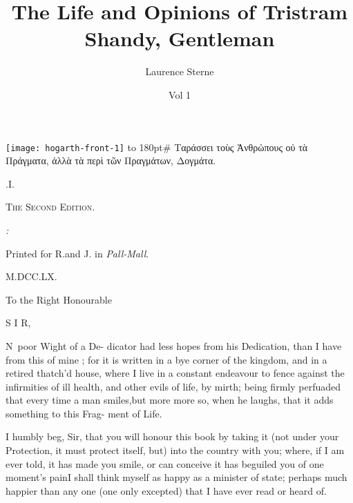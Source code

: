 \documentclass{article}
\title{The Life and Opinions of Tristram Shandy, Gentleman}
\author{Laurence Sterne}
\date{Vol 1}
\begin{document}
\pagestyle{empty}
\null\newpage
\texttt{[image: hogarth-front-1]}
\newpage
\vbox{\openup 10pt}
\vfill
\vbox{\openup -2pt\halign to 180pt{\footnotesize #\cr
\quad Ταράσσει τοὺς Ἀνθρὠπους οὐ τὰ Πράγματα,\cr
ἀλλὰ τὰ περὶ τῶν Πραγμἀτων, Δογμἀτα.\hfill\cr}}
\vfill
\centerline{.\quad I.}
\smallskip
\centerline{\textsc{The Second Edition}.}
\vfill
\centerline{\itshape{}:}
\centerline{\smaller Printed for R.\@ and J.\@ {} in \textit{Pall-Mall}.}
\centerline{M.DCC.LX.}

\newpage
\null
\newpage
\pagestyle{dedication}
\thispagestyle{empty}
\centerline{\small To the Right Honourable}
\vfill
{}

\vfill

\bgroup
\fontsize{11}{15}\selectfont

\indent S I R,

\lettrine{N}{\,} poor Wight of a De-\break
dicator had less hopes from\break
his Dedication, than I have from\break
this of mine ; for it is written in\break
a bye corner of the kingdom, and\break
in a retired thatch'd house, where\break
I live in a constant endeavour to\break
fence against the infirmities of ill\break
health, and other evils of life, by
mirth; being firmly perfuaded that
every time a man smiles,\tsk but\break
more more so, when he laughs,\break
that it adds something to this Frag-\break
ment of Life.

I humbly beg, Sir, that you\break
will honour this book by taking\break
it \tsh (not under your Protection,\break
\tsh it must protect itself, but)\tsk\break
into the country with you; where,\break
if I am ever told, it has made\break
you smile, or can conceive it has\break
beguiled you of one moment's\break
pain\tsh I shall think myself as\break
happy as a minister of state;\tsh\break
perhaps much happier than any
one (one only excepted) that I have\break
ever read or heard of.

\bigskip

\egroup
\end{document}
